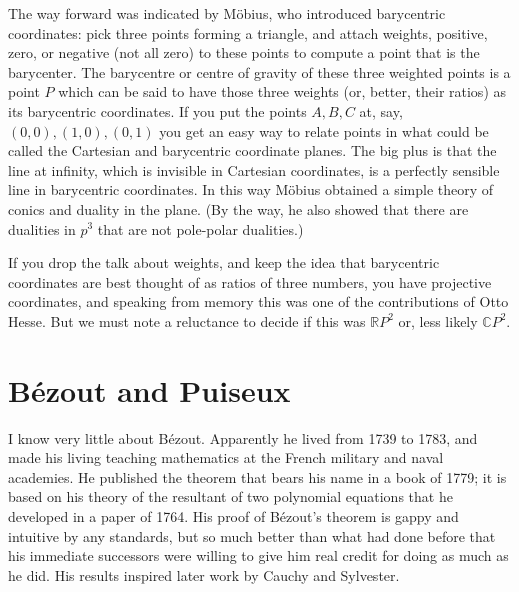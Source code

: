 \documentclass[11pt]{book}
\newcommand{\R}{\mathbb{R}}
\newcommand{\C}{\mathbb{C}}
\begin{document}
The way forward was indicated by M\"obius, who introduced barycentric coordinates: pick three points forming a triangle, and attach weights, positive, zero, or negative (not all zero) to these points to compute a point that is the barycenter. The barycentre or centre of gravity of these three weighted points is a point $P$ which can be said to have those three weights (or, better, their ratios) as its barycentric coordinates. If you put the points $A, B, C$ at, say,  $(0, 0), (1, 0), (0, 1)$ you get an easy way to relate points in what could be called the Cartesian and barycentric coordinate planes. The big plus is that the line at infinity, which is invisible in Cartesian coordinates, is a perfectly sensible line in barycentric coordinates. In this way M\"obius obtained a simple theory of conics and duality in the plane. (By the way, he also showed that there are dualities in $p^3$ that are not pole-polar dualities.)

If you drop the talk about weights, and keep the idea that barycentric coordinates are best thought of as ratios of three numbers, you have projective coordinates, and speaking from memory this was one of the contributions of Otto Hesse. But we must note a reluctance to decide if this was $\R P^2$ or, less likely $\C P^2$.


\section{B\'ezout and Puiseux}
I know very little about B\'ezout. Apparently he lived from 1739 to 1783, and made his living teaching mathematics at the French military and naval academies. He published the theorem that bears his name in a book of 1779; it is based on his theory of the resultant of two polynomial equations that he developed in a paper of 1764. His proof of B\'ezout's theorem is gappy and intuitive by any standards, but so much better than what had done before that his immediate successors were willing to give him real credit for doing as much as he did. His results inspired later work by Cauchy and Sylvester.
\end{document}
